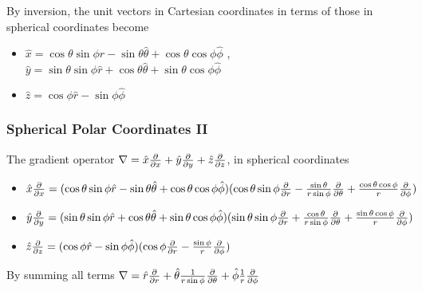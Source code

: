 \documentclass[8pt,t,mathserif,aspectratio=169]{beamer}
\begin{document}
\begin{frame}
\begin{itemize}
  \end{itemize}
  By inversion, the unit vectors in Cartesian coordinates in terms of those in spherical coordinates become
  \begin{itemize}
    \item $\hat{x} = \cos{\theta} \sin{\phi} \hat{r} - \sin{\theta} \hat{\theta} + \cos{\theta} \cos{\phi} \hat{\phi}$ , $\hat{y} = \sin{\theta} \sin{\phi} \hat{r} + \cos{\theta} \hat{\theta} + \sin{\theta} \cos{\phi} \hat{\phi}$
    \item $\hat{z} = \cos{\phi} \hat{r} - \sin{\phi} \hat{\phi}$
  \end{itemize}
\end{frame}

\begin{frame}
  \frametitle{Spherical Polar Coordinates II}
  \vspace{1mm}
  The gradient operator $\nabla = \hat{x} {\partial \over \partial x} + \hat{y} {\partial \over \partial y} + \hat{z} {\partial \over \partial z}$, in spherical coordinates
  \begin{itemize}
    \item $\hat{x} {\partial \over \partial x} = (\cos{\theta} \sin{\phi} \hat{r} - \sin{\theta} \hat{\theta} + \cos{\theta} \cos{\phi} \hat{\phi})(\cos{\theta} \sin{\phi} {\partial \over \partial r} - {\sin{\theta} \over r \sin{\phi}} {\partial \over \partial \theta} + {\cos{\theta} \cos{\phi} \over r} {\partial \over \partial \phi})$
    \item $\hat{y} {\partial \over \partial y} = (\sin{\theta} \sin{\phi} \hat{r} + \cos{\theta} \hat{\theta} + \sin{\theta} \cos{\phi} \hat{\phi})(\sin{\theta} \sin{\phi} {\partial \over \partial r} + {\cos{\theta} \over r \sin{\phi}} {\partial \over \partial \theta} + {\sin{\theta} \cos{\phi} \over r} {\partial \over \partial \phi})$
    \item $\hat{z} {\partial \over \partial z} = (\cos{\phi} \hat{r} - \sin{\phi} \hat{\phi})(\cos{\phi} {\partial \over \partial r} - {\sin{\phi} \over r} {\partial \over \partial \phi})$
  \end{itemize}
  By summing all terms $\nabla = \hat{r} {\partial \over \partial r} + \hat{\theta} {1 \over r \sin{\phi}} {\partial \over \partial \theta} + \hat{\phi} {1 \over r}{\partial \over \partial \phi}$
\end{frame}
\end{document}
